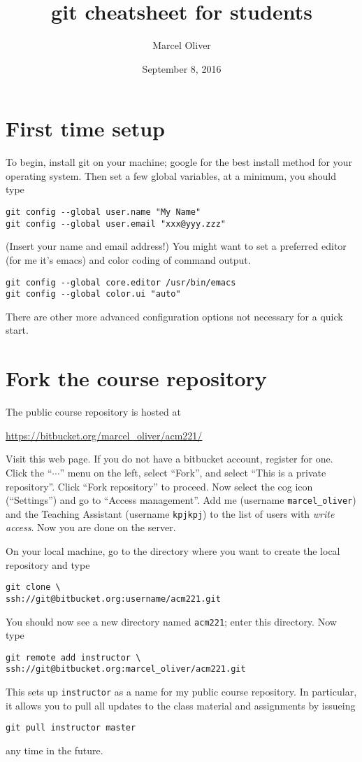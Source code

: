 \documentclass[twocolumn,secnumarabic,rmp]{revtex4}
\begin{document}
\title{\textsf{git} cheatsheet for students}
\author{Marcel Oliver}
\date{September 8, 2016}
\maketitle

\section{First time setup}
\label{s.first}

To begin, install \textsf{git} on your machine; google for the best
install method for your operating system.  Then set a few global
variables, at a minimum, you should type
\begin{verbatim}
git config --global user.name "My Name"
git config --global user.email "xxx@yyy.zzz"
\end{verbatim}
(Insert your name and email address!) You might want to set a
preferred editor (for me it's \textsf{emacs}) and color coding of
command output.
\begin{verbatim}
git config --global core.editor /usr/bin/emacs
git config --global color.ui "auto"
\end{verbatim}
There are other more advanced configuration options not necessary for
a quick start.

\section{Fork the course repository}

The public course repository is hosted at
\begin{center}
  \url{https://bitbucket.org/marcel_oliver/acm221/}
\end{center}
Visit this web page.  If you do not have a \textsf{bitbucket} account,
register for one.  Click the ``$\cdots$'' menu on the left, select
``Fork'', and select ``This is a private repository''.  Click ``Fork
repository'' to proceed.  Now select the cog icon (``Settings'') and
go to ``Access management''.  Add me (username \verb+marcel_oliver+)
and the Teaching Assistant (username \texttt{kpjkpj}) to the list of users
with \emph{write access}.  Now you are done on the server.

On your local machine, go to the directory where you want to create
the local repository and type
\begin{verbatim}
git clone \
ssh://git@bitbucket.org:username/acm221.git
\end{verbatim}
You should now see a new directory named \texttt{acm221}; enter this
directory.  Now type
\begin{verbatim}
git remote add instructor \
ssh://git@bitbucket.org:marcel_oliver/acm221.git
\end{verbatim}
This sets up \texttt{instructor} as a name for my public course
repository.  In particular, it allows you to pull all updates to the
class material and assignments by issueing
\begin{verbatim}
git pull instructor master
\end{verbatim}
any time in the future. 
\end{document}
